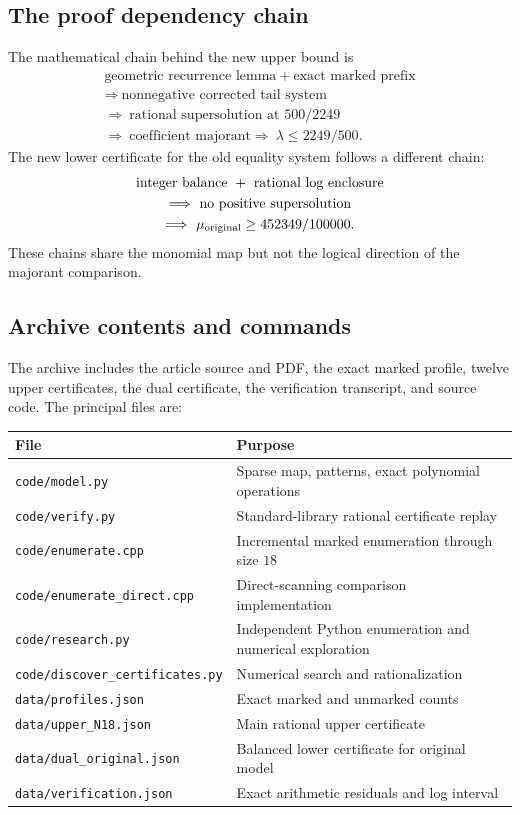 \documentclass[11pt,a4paper]{article}
\theoremstyle{definition}
\theoremstyle{remark}
\begin{document}
\subsection{The proof dependency chain}
The mathematical chain behind the new upper bound is
\[
\begin{gathered}
 \text{geometric recurrence lemma}
 \ +\ \text{exact marked prefix}\\
 \Longrightarrow\ \text{nonnegative corrected tail system}\\
 \Longrightarrow\ \text{rational supersolution at }500/2249\\
 \Longrightarrow\ \text{coefficient majorant}
 \Longrightarrow\ \lambda\leq2249/500.
\end{gathered}
\]
The new lower certificate for the old equality system follows a different
chain:
\[
\begin{gathered}
 \text{integer balance}\ +\ \text{rational log enclosure}\\
 \Longrightarrow\ \text{no positive supersolution}\\
 \Longrightarrow\ \mu_{\rm original}\geq452349/100000.
\end{gathered}
\]
These chains share the monomial map but not the logical direction of the
majorant comparison.

\subsection{Archive contents and commands}
The archive includes the article source and PDF, the exact marked profile,
twelve upper certificates, the dual certificate, the verification transcript,
and source code. The principal files are:
\begin{center}\small
\begin{tabular}{@{}ll@{}}
\toprule
File & Purpose\\
\midrule
\texttt{code/model.py} & Sparse map, patterns, exact polynomial operations\\
\texttt{code/verify.py} & Standard-library rational certificate replay\\
\texttt{code/enumerate.cpp} & Incremental marked enumeration through size $18$\\
\texttt{code/enumerate\_direct.cpp} & Direct-scanning comparison implementation\\
\texttt{code/research.py} & Independent Python enumeration and numerical exploration\\
\texttt{code/discover\_certificates.py} & Numerical search and rationalization\\
\texttt{data/profiles.json} & Exact marked and unmarked counts\\
\texttt{data/upper\_N18.json} & Main rational upper certificate\\
\texttt{data/dual\_original.json} & Balanced lower certificate for original model\\
\texttt{data/verification.json} & Exact arithmetic residuals and log interval\\
\bottomrule
\end{tabular}
\end{center}
\end{document}
